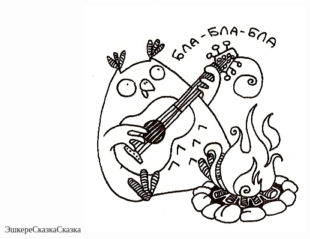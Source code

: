 \documentclass[11pt,a5paper]{book}
\begin{document}
\begin{song}{Эшкере}{}{Сказка}{Сказка}{}{}
\centering\includegraphics[scale=0.5]{5}
\end{song}
\end{document}
